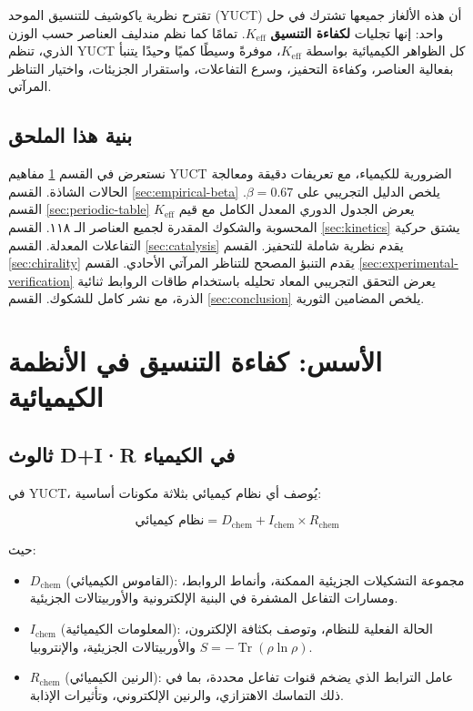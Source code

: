 \documentclass[12pt,a4paper]{article}
\theoremstyle{remark}
\newcommand{\Keff}{K_{\mathrm{eff}}}
\DeclareMathOperator{\Tr}{Tr}
\begin{document}
	تقترح نظرية ياكوشيف للتنسيق الموحد (YUCT) أن هذه الألغاز جميعها تشترك في حل واحد: إنها تجليات \textbf{لكفاءة التنسيق} $\Keff$. تمامًا كما نظم مندليف العناصر حسب الوزن الذري، تنظم YUCT كل الظواهر الكيميائية بواسطة $\Keff$، موفرةً وسيطًا كميًا وحيدًا يتنبأ بفعالية العناصر، وكفاءة التحفيز، وسرع التفاعلات، واستقرار الجزيئات، واختيار التناظر المرآتي.
	
	\subsection{بنية هذا الملحق}
	
	نستعرض في القسم \ref{sec:foundations} مفاهيم YUCT الضرورية للكيمياء، مع تعريفات دقيقة ومعالجة الحالات الشاذة. القسم \ref{sec:empirical-beta} يلخص الدليل التجريبي على $\beta = 0.67$. القسم \ref{sec:periodic-table} يعرض الجدول الدوري المعدل الكامل مع قيم $\Keff$ المحسوبة والشكوك المقدرة لجميع العناصر الـ ١١٨. القسم \ref{sec:kinetics} يشتق حركية التفاعلات المعدلة. القسم \ref{sec:catalysis} يقدم نظرية شاملة للتحفيز. القسم \ref{sec:chirality} يقدم التنبؤ المصحح للتناظر المرآتي الأحادي. القسم \ref{sec:experimental-verification} يعرض التحقق التجريبي المعاد تحليله باستخدام طاقات الروابط ثنائية الذرة، مع نشر كامل للشكوك. القسم \ref{sec:conclusion} يلخص المضامين الثورية.
	
	\section{الأسس: كفاءة التنسيق في الأنظمة الكيميائية}
	\label{sec:foundations}
	
	\subsection{ثالوث D+I·R في الكيمياء}
	
	في YUCT، يُوصف أي نظام كيميائي بثلاثة مكونات أساسية:
	
	\begin{equation}
		\text{نظام كيميائي} = D_{\text{chem}} + I_{\text{chem}} \times R_{\text{chem}}
		\label{eq:chem-triad}
	\end{equation}
	
	حيث:
	\begin{itemize}
		\item $D_{\text{chem}}$ (القاموس الكيميائي): مجموعة التشكيلات الجزيئية الممكنة، وأنماط الروابط، ومسارات التفاعل المشفرة في البنية الإلكترونية والأوربيتالات الجزيئية.
		\item $I_{\text{chem}}$ (المعلومات الكيميائية): الحالة الفعلية للنظام، وتوصف بكثافة الإلكترون، والأوربيتالات الجزيئية، والإنتروبيا $S = -\Tr(\rho \ln \rho)$.
		\item $R_{\text{chem}}$ (الرنين الكيميائي): عامل الترابط الذي يضخم قنوات تفاعل محددة، بما في ذلك التماسك الاهتزازي، والرنين الإلكتروني، وتأثيرات الإذابة.
	\end{itemize}
	
\end{document}
